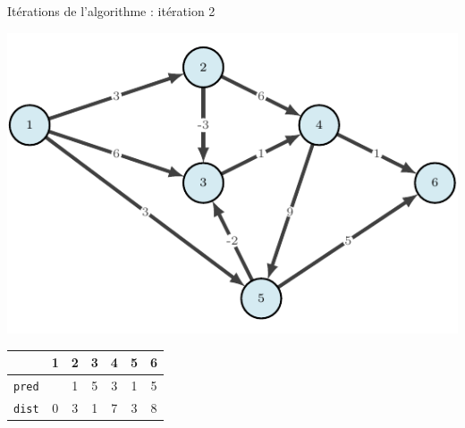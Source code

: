 \begin{frame}{Itérations de l'algorithme : itération 2}
    \begin{center}
        \includegraphics[height=.6\textheight]{fig/bellmann-0.pdf}      
    \begin{tabular}{c|cccccc}
      
        & 1    &2      &3      &4      &5      &6      \\
        \hline
        \texttt{pred} & &1      &5      &3      &1      &5           \\
        \texttt{dist} & 0       &3      &1      &7      &3      &8      \\
        
    \end{tabular}
\end{center}
\end{frame}


